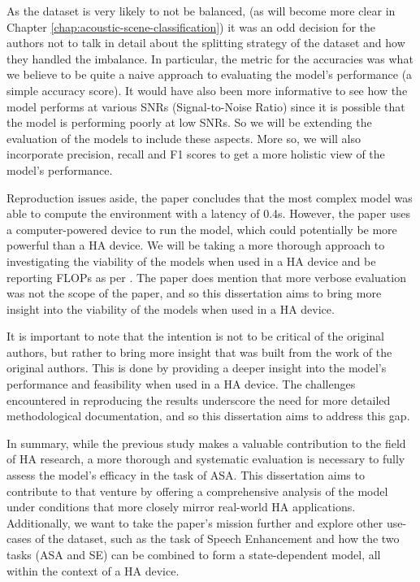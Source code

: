 \documentclass[logo,bsc,singlespacing,parskip,online]{infthesis}
\begin{document}
As the dataset is very likely to not be balanced, (as will become more clear in Chapter \ref{chap:acoustic-scene-classification})
it was an odd decision for the authors 
not to talk in detail about the splitting strategy of the dataset 
and how they handled the imbalance. In particular, the metric 
for the accuracies was what we believe to be quite a 
naive approach to evaluating the model's performance (a simple accuracy score).
It would have also been more informative to see how the model performs at various 
SNRs (Signal-to-Noise Ratio) since it is possible that the model is performing poorly at low SNRs.
So we will be extending the evaluation of the models to include these aspects. 
More so, we will also incorporate precision, recall and F1 scores to get a more 
holistic view of the model's performance. 

Reproduction issues aside, the paper concludes that the 
most complex model was able to compute the environment 
with a latency of 0.4s. However, the paper uses 
a computer-powered device to run the model, which 
could potentially be more powerful than a HA device. 
We will be taking a more thorough approach to
investigating the viability of the models when used in a HA device 
and be reporting FLOPs as per \citet{schwartz2019greenai}.
The paper does mention that more verbose evaluation was not 
the scope of the paper, and so this dissertation aims 
to bring more insight into the viability of the models 
when used in a HA device.

It is important to note that the intention is not to 
be critical of the original authors, but rather to 
bring more insight that was built from the work of the original authors.
This is done by providing a deeper insight into the model's performance 
and feasibility when used in a HA device. The challenges encountered 
in reproducing the results underscore the need for more 
detailed methodological documentation, and so this dissertation aims 
to address this gap.

In summary, while the previous study makes a valuable contribution
to the field of HA research, a more thorough and systematic
evaluation is necessary to fully assess the model's efficacy 
in the task of ASA. This dissertation aims to contribute 
to that venture by offering a comprehensive analysis
of the model under conditions that more closely mirror real-world HA applications.
Additionally, we want to take the paper's mission further and explore 
other use-cases of the dataset, such as the task of Speech Enhancement 
and how the two tasks (ASA and SE) can be combined to form a state-dependent model,
all within the context of a HA device.
\end{document}

